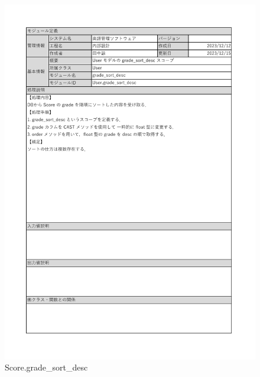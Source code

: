 \begin{figure}
    \centering
    \includegraphics[scale=0.5]{img/Model/gradeSort_desc.pdf}
    \caption{Score.grade\_sort\_desc}
\end{figure}
